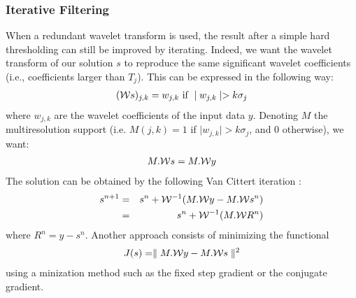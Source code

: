 \begin{itemize}
\subsubsection*{Iterative Filtering}
When a redundant wavelet transform is used, the result after a simple hard 
thresholding can still be improved by iterating. Indeed, we want  the
wavelet transform of our solution $s$ to reproduce the same significant 
wavelet coefficients (i.e., coefficients larger than $T_j$). This can 
be expressed in the following way:
\begin{eqnarray}
 ({\cal W} s)_{j,k} = w_{j,k} \mbox{ if  } \mid w_{j,k}  \mid > k \sigma_j
\end{eqnarray}
where $w_{j,k}$ are the wavelet coefficients of the input data $y$. Denoting
$M$ the multiresolution support (i.e. $M(j,k) = 1$ if 
$ \mid w_{j,k}  \mid > k \sigma_j$, and 0 otherwise), we want:
\begin{eqnarray*}
 M.{\cal W} s  = M.{\cal W} y
\end{eqnarray*}
The solution can be obtained by the following Van Cittert 
iteration \cite{starck:book98}:
\begin{eqnarray}
 s^{n+1} & = & s^n +  {\cal W}^{-1} (M.{\cal W} y - M.{\cal W} s^n)  \nonumber \\
          & = & s^n +  {\cal W}^{-1} (M.{\cal W} R^n)
\label{eqn_iter_support}
\end{eqnarray}
where $R^n = y- s^n$.
Another approach consists of minimizing the functional
\begin{eqnarray}
 J(s) = \parallel M.{\cal W} y - M.{\cal W} s  \parallel^2
\label{eqn_iter_gradient}
\end{eqnarray}
using a minization method such as the fixed step gradient or the 
conjugate gradient.


\end{itemize}
